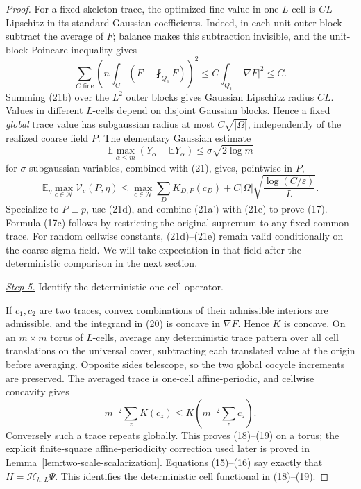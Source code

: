 \documentclass{aomart}
\theoremstyle{definition}
\newcommand{\1}{\mathbf 1}
\begin{document}
\begin{proof}
For a fixed skeleton trace, the optimized fine value in one $L$-cell
is $CL$-Lipschitz in its standard Gaussian coefficients.  Indeed, in
each unit outer block subtract the average of $F$; balance makes this
subtraction invisible, and the unit-block Poincare inequality gives
\begin{equation}
\sum_ {C\text{ fine}}
\left(n\int_ C(F-\fint_ {Q_ 1}F)\right)^2
\leq C\int_ {Q_ 1}|\nabla F|^2\leq C.
\tag{21b}
\end{equation}
Summing (21b) over the $L^2$ outer blocks gives Gaussian Lipschitz
radius $CL$.  Values in different $L$-cells depend on disjoint
Gaussian blocks.  Hence a fixed \emph{global} trace value has subgaussian
radius at most $C\sqrt{|\Omega|}$, independently of the realized
coarse field $P$.  The elementary
Gaussian estimate
\begin{equation*}
\mathbb E\max_ {\alpha\leq m}(Y_ \alpha-\mathbb EY_ \alpha)
\leq \sigma\sqrt{2\log m}
\end{equation*}
for $\sigma$-subgaussian variables, combined with (21), gives,
pointwise in $P$,
\begin{equation}
\mathbb E_ \eta\max_ {c\in\mathcal N}\mathcal V_ c(P,\eta)
\leq\max_ {c\in\mathcal N}\sum_ DK_ {D,P}(c_ D)
+C|\Omega|\sqrt{\frac{\log(C/\varepsilon)}L}.
\tag{21e}
\end{equation}
Specialize to $P\equiv p$, use (21d), and combine (21a') with (21e) to prove
(17).  Formula (17c) follows by restricting the original supremum to
any fixed common trace.  For random cellwise constants, (21d)--(21e) remain valid conditionally
on the coarse sigma-field.  We will take expectation in that field after
the deterministic comparison in the next section.

\smallskip\noindent
\underline{\textit{Step 5.}} Identify the deterministic one-cell operator.

If $c_ 1,c_ 2$ are two traces, convex combinations of their admissible
interiors are admissible, and the integrand in (20) is concave in
$\nabla F$. Hence $K$ is concave. On an $m\times m$ torus of
$L$-cells, average any deterministic trace pattern over all cell
translations on the universal cover, subtracting each translated value
at the origin before averaging.  Opposite sides telescope, so the two
global cocycle increments are preserved.  The averaged trace is
one-cell affine-periodic, and cellwise concavity gives
\begin{equation*}
m^{-2}\sum_ zK(c_ z)\leq K\!\left(m^{-2}\sum_ zc_ z\right).
\end{equation*}
Conversely such a trace repeats globally. This proves (18)--(19) on a
torus; the explicit finite-square affine-periodicity correction used later is
proved in Lemma~\ref{lem:two-scale-scalarization}.  Equations (15)--(16) say
exactly that $H=\mathcal H_ {h,L}\Psi$.  This identifies the deterministic
cell functional in (18)--(19).

\end{proof}
\end{document}
